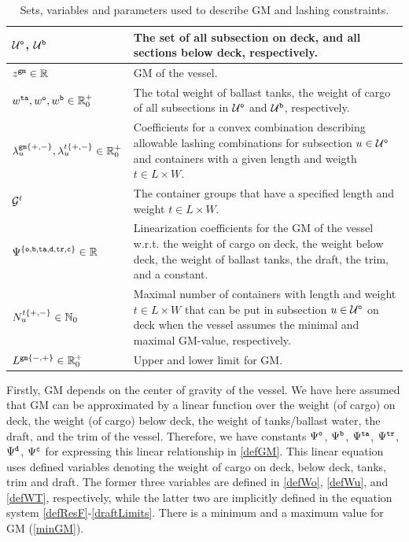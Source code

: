 \begin{table}[width=.9\linewidth,cols=2,pos=htbp]
\caption{Sets, variables and parameters used to describe GM and lashing constraints.}\label{tab:gm}
\begin{tabular*}{\tblwidth}{@{} Lp{11.5cm} @{}}
\toprule
$\mathcal{U}^\texttt{o}$, $\mathcal{U}^\texttt{b}$	& The set of all subsection on deck, and all sections below deck, respectively.\\
\midrule
$z^{\texttt{gm}}\in\mathbb{R}$			&	GM of the vessel.\\
$w^{\texttt{ta}}, w^\texttt{o}, w^\texttt{b}\in\mathbb{R}^+_0$	
									&	The total weight of ballast tanks, the weight of cargo of all subsections in $\mathcal{U}^\texttt{o}$  and $\mathcal{U}^\texttt{b}$, respectively.\\
$\lambda^{\texttt{gm}\{+,-\}}_{u}, \lambda^{t\{+,-\}}_{u}\in\mathbb{R}^+_0$ 
									&	Coefficients for a convex combination describing allowable lashing combinations for subsection $u\in \mathcal{U}^\texttt{o}$ and containers with a given length and weigth $t\in L\times W$.\\
\midrule
$\mathcal{G}^t$							& The container groups that have a specified length and weight $t\in L\times W$.\\
$\Psi^{\{\tt{o},\texttt{b},\texttt{ta},\texttt{d},\texttt{tr},\texttt{c}\}}\in\mathbb{R}$	
									& Linearization coefficients for the GM of the vessel w.r.t. the weight of cargo on deck, the weight below deck, the weight of ballast tanks, the draft, the trim, and a constant.\\
$N^{t\{+,-\}}_{u}\in\mathbb{N}_0$		& Maximal number of containers with length and weight $t\in L\times W$ that can be put in subsection $u\in \mathcal{U}^\texttt{o}$ on deck when the vessel assumes the minimal and maximal GM-value, respectively.\\
$L^{\texttt{gm}\{-,+\}}\in\mathbb{R}^+_0$ 	& Upper and lower limit for GM.\\
\bottomrule
\end{tabular*}
\end{table}
 
Firstly, GM depends on the center of gravity of the vessel. We have here assumed that GM can be approximated by a linear function over the weight (of cargo) on deck, the weight (of cargo) below deck, the weight of tanks/ballast water, the draft, and the trim of the vessel. Therefore, we have constants $\Psi^{\texttt{o}}$, $\Psi^{\texttt{b}}$, $\Psi^{\texttt{ta}}$, $\Psi^{\texttt{tr}}$, $\Psi^{\texttt{d}}$, $\Psi^{\texttt{c}}$ for expressing this linear relationship in \eqref{defGM}. This linear equation uses defined variables denoting the weight of cargo on deck, below deck, tanks, trim and draft. The former three variables are defined in \eqref{defWo}, \eqref{defWu}, and \eqref{defWT}, respectively, while the latter two are implicitly defined in the equation system \eqref{defResF}-\eqref{draftLimits}. There is a minimum and a maximum value for GM (\ref{minGM}). %

